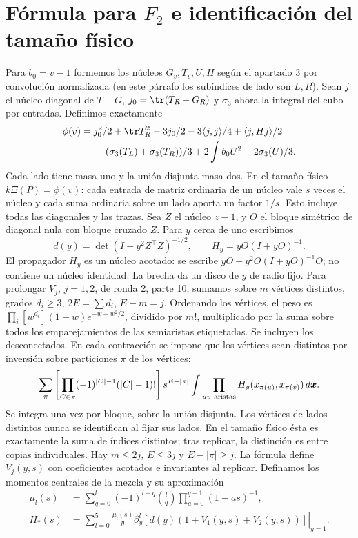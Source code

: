 \section{Fórmula para $F_2$ e identificación del tamaño físico}
Para $b_0=v-1$ formemos los núcleos $G_v,T_v,U,H$ según el apartado 3 por convolución
normalizada (en este párrafo los subíndices de lado son $L,R$). Sean $j$ el núcleo diagonal
de $T-G$, $j_0=\tr(T_R-G_R)$ y $\sigma_3$ ahora la integral del cubo por entradas.
Definimos exactamente
\begin{align*}
 \phi(v)={}&j_0^2/2+\tr T_R^2-3j_0/2-3\langle j,j\rangle/4+\langle j,Hj\rangle/2\\
 &-(\sigma_3(T_L)+\sigma_3(T_R))/3+2\int b_0U^2+2\sigma_3(U)/3.
\end{align*}
Cada lado tiene masa uno y la unión disjunta masa dos. En el tamaño físico $k\Xi(P)=\phi(v)$:
cada entrada de matriz ordinaria de un núcleo vale $s$ veces el núcleo y cada suma
ordinaria sobre un lado aporta un factor $1/s$. Esto incluye todas las diagonales y las trazas.
Sea $Z$ el núcleo $z-1$, y $O$ el bloque simétrico de diagonal nula con bloque cruzado $Z$.
Para $y$ cerca de uno escribimos
\[
 d(y)=\det(I-y^2 Z^\top Z)^{-1/2},\qquad H_y=yO(I+yO)^{-1}.
\]
El propagador $H_y$ es un núcleo acotado: se escribe $yO-y^2 O(I+yO)^{-1}O$;
no contiene un núcleo identidad. La brecha da un disco de $y$ de radio fijo.
Para prolongar $V_j$, $j=1,2$, de ronda 2, parte 10, sumamos sobre $m$ vértices
distintos, grados $d_i\ge3$, $2E=\sum d_i$, $E-m=j$. Ordenando los vértices,
el peso es $\prod_i[w^{d_i}](1+w)e^{-w+w^2/2}$, dividido por $m!$, multiplicado
por la suma sobre todos los emparejamientos de las semiaristas etiquetadas.
Se incluyen los desconectados. En cada contracción se impone que los vértices sean
distintos por inversión sobre particiones $\pi$ de los vértices:
\[
 \sum_\pi\left[\prod_{C\in\pi}(-1)^{|C|-1}(|C|-1)!\right]
 s^{E-|\pi|}\int\prod_{uv\ {\rm aristas}} H_y(x_{\pi(u)},x_{\pi(v)})\,d\boldsymbol x.
\]
Se integra una vez por bloque, sobre la unión disjunta. Los vértices de lados distintos
nunca se identifican al fijar sus lados. En el tamaño físico ésta es exactamente la
suma de índices distintos; tras replicar, la distinción es entre copias individuales.
Hay $m\le2j$, $E\le3j$ y $E-|\pi|\ge j$. La fórmula define $V_j(y,s)$ con coeficientes
acotados e invariantes al replicar.
Definamos los momentos centrales de la mezcla y su aproximación
\begin{align*}
 \mu_l(s)&=\sum_{q=0}^l(-1)^{l-q}\binom lq\prod_{a=0}^{q-1}(1-as)^{-1},\\
 H_*(s)&=\sum_{l=0}^5\frac{\mu_l(s)}{l!}
 \left.\partial_y^l[d(y)(1+V_1(y,s)+V_2(y,s))]\right|_{y=1}.
\end{align*}
